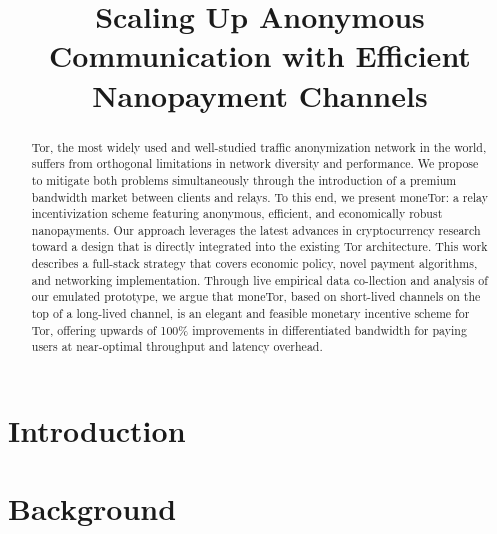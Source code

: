 \documentclass[USenglish,oneside,twocolumn]{article}
\begin{document}
 

\title{\huge Scaling Up Anonymous Communication with Efficient Nanopayment Channels} %


\begin{abstract}
{Tor, the most widely used and well-studied traffic anonymization network in
  the world, suffers from orthogonal limitations in network diversity and
  performance. We propose to mitigate both problems simultaneously through the
  introduction of a premium bandwidth market between clients and relays. To this
  end, we present moneTor: a relay incentivization scheme featuring anonymous,
  efficient, and economically robust nanopayments. Our approach leverages the
  latest advances in cryptocurrency research toward a design that is directly
  integrated into the existing Tor architecture. This work describes a
  full-stack strategy that covers economic policy, novel payment algorithms, and
  networking implementation. Through live empirical data co-llection and analysis
  of our emulated prototype, we argue that moneTor, based on short-lived channels on the top of a long-lived channel, is an elegant and
  feasible monetary incentive scheme for Tor, offering upwards of 100\%
  improvements in differentiated bandwidth for paying users at near-optimal
  throughput and latency overhead.}
\end{abstract}



  
  
 \maketitle


\section{Introduction}
\label{sec:introduction}


\section{Background}
\label{sec:background}

\end{document}
